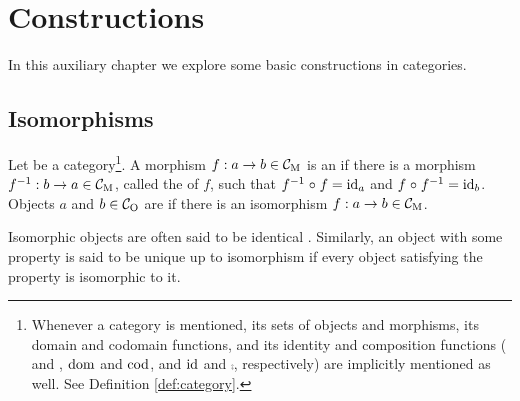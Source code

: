 \chapter{Constructions}
\label{chap:constructions}

In this auxiliary chapter we explore some basic constructions in
categories.

\section{Isomorphisms}
\label{sec:constructions-isomorphisms}


\begin{definition}

  \label{def:isomorphism}


  Let  be a category\footnote{Whenever a category  is
    mentioned, its sets of objects and morphisms, its domain and
    codomain functions, and its identity and composition functions
    ( and , $\operatorname{dom}$ and $\operatorname{cod}$, and $\operatorname{id}$ and $\comp$,
    respectively) are implicitly mentioned as well. See Definition
    \ref{def:category}.}. A morphism $f: a \to b \in \mathcal{C}_{\operatorname{M}}$ is an
   if there is a morphism $f^{-1}: b \to a \in
  \mathcal{C}_{\operatorname{M}}$, called the  of $f$, such that $f^{-1} \mathrel{\circ}
  f = \operatorname{id}_{a}$ and $f \mathrel{\circ} f^{-1} = \operatorname{id}_{b}$. Objects $a$ and $b \in
  \mathcal{C}_{\operatorname{O}}$ are  if there is an isomorphism $f: a \to
  b \in \mathcal{C}_{\operatorname{M}}$.

\end{definition}

\begin{definition}

  \label{def:up-to-isomorphism}


  Isomorphic objects are often said to be identical . Similarly, an object with some property is said to
  be unique up to isomorphism if every object satisfying the property
  is isomorphic to it.

\end{definition}

